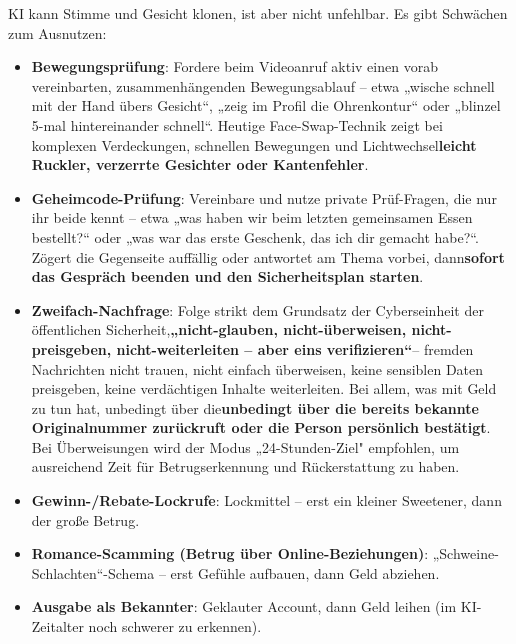 
KI kann Stimme und Gesicht klonen, ist aber nicht unfehlbar. Es gibt Schwächen zum Ausnutzen:

\begin{itemize}
  \item \textbf{Bewegungsprüfung}: Fordere beim Videoanruf aktiv einen vorab vereinbarten, zusammenhängenden Bewegungsablauf – etwa „wische schnell mit der Hand übers Gesicht“, „zeig im Profil die Ohrenkontur“ oder „blinzel 5-mal hintereinander schnell“. Heutige Face-Swap-Technik zeigt bei komplexen Verdeckungen, schnellen Bewegungen und Lichtwechsel\textbf{leicht Ruckler, verzerrte Gesichter oder Kantenfehler}.
  \item \textbf{Geheimcode-Prüfung}: Vereinbare und nutze private Prüf-Fragen, die nur ihr beide kennt – etwa „was haben wir beim letzten gemeinsamen Essen bestellt?“ oder „was war das erste Geschenk, das ich dir gemacht habe?“. Zögert die Gegenseite auffällig oder antwortet am Thema vorbei, dann\textbf{sofort das Gespräch beenden und den Sicherheitsplan starten}.
  \item \textbf{Zweifach-Nachfrage}: Folge strikt dem Grundsatz der Cyberseinheit der öffentlichen Sicherheit,\textbf{„nicht-glauben, nicht-überweisen, nicht-preisgeben, nicht-weiterleiten – aber eins verifizieren“}– fremden Nachrichten nicht trauen, nicht einfach überweisen, keine sensiblen Daten preisgeben, keine verdächtigen Inhalte weiterleiten. Bei allem, was mit Geld zu tun hat, unbedingt über die\textbf{unbedingt über die bereits bekannte Originalnummer zurückruft oder die Person persönlich bestätigt}. Bei Überweisungen wird der Modus „24-Stunden-Ziel" empfohlen, um ausreichend Zeit für Betrugserkennung und Rückerstattung zu haben.
\end{itemize}


\begin{itemize}
  \item \textbf{Gewinn-/Rebate-Lockrufe}: Lockmittel – erst ein kleiner Sweetener, dann der große Betrug.
  \item \textbf{Romance-Scamming (Betrug über Online-Beziehungen)}: „Schweine-Schlachten“-Schema – erst Gefühle aufbauen, dann Geld abziehen.
  \item \textbf{Ausgabe als Bekannter}: Geklauter Account, dann Geld leihen (im KI-Zeitalter noch schwerer zu erkennen).
\end{itemize}

